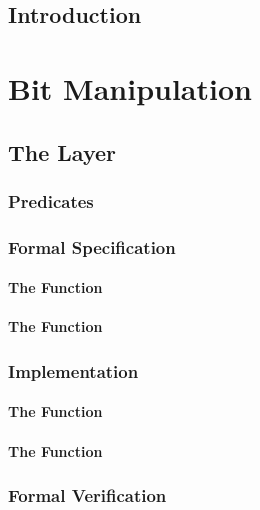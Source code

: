 \documentclass[paper=a4,12pt,DIV16,BCOR8mm,twoside]{scrreprt}
\begin{document}

%
%
%

\listoffixmes
\tableofcontents
\listoffigures
{}

\chapter{Introduction}

\part{Bit Manipulation}



\chapter{The  Layer}

\section{Predicates}

\section{Formal Specification}
\subsection{The Function }
\subsection{The Function }

\section{Implementation}
\subsection{The Function }
\subsection{The Function }

\section{Formal Verification}
\end{document}
